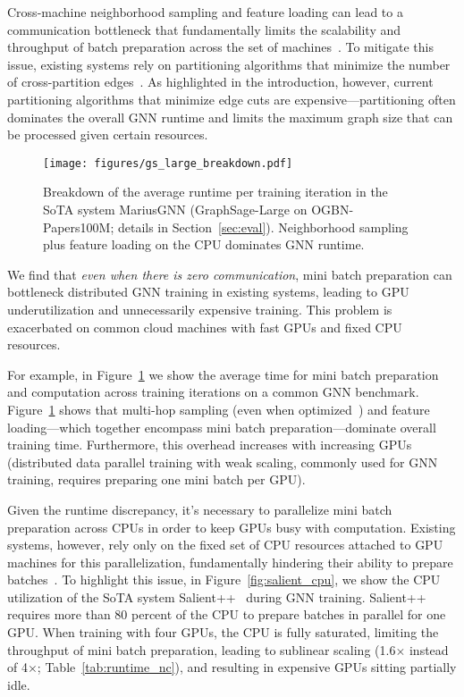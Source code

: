 Cross-machine neighborhood sampling and feature loading can lead to a communication bottleneck that fundamentally limits the scalability and throughput of batch preparation across the set of machines~\cite{salient++}. To mitigate this issue, existing systems rely on partitioning algorithms that minimize the number of cross-partition edges~\cite{distdglv2}. As highlighted in the introduction, however, current partitioning algorithms that minimize edge cuts are expensive---partitioning often dominates the overall GNN runtime and limits the maximum graph size that can be processed given certain resources. 



\begin{figure}[t]
  \centering
  \texttt{[image: figures/gs\_large\_breakdown.pdf]}
  \vspace{-0.15in}
  \caption{Breakdown of the average runtime per training iteration in the SoTA system MariusGNN (GraphSage-Large on OGBN-Papers100M; details in Section~\ref{sec:eval}). Neighborhood sampling plus feature loading on the CPU dominates GNN runtime.}
  \label{fig:armada_breakdown}
  \vspace{-0.15in}
\end{figure}



We find that \textit{even when there is zero communication}, mini batch preparation can bottleneck distributed GNN training in existing systems, leading to GPU underutilization and unnecessarily expensive training. This problem is exacerbated on common cloud machines with fast GPUs and fixed CPU resources. 

For example, in Figure~\ref{fig:armada_breakdown} we show the average time for mini batch preparation and computation across training iterations on a common GNN benchmark. Figure~\ref{fig:armada_breakdown} shows that multi-hop sampling (even when optimized~\cite{mariusgnn}) and feature loading---which together encompass mini batch preparation---dominate overall training time. Furthermore, this overhead increases with increasing GPUs (distributed data parallel training with weak scaling, commonly used for GNN training, requires preparing one mini batch per GPU). 

Given the runtime discrepancy, it's necessary to parallelize mini batch preparation across CPUs in order to keep GPUs busy with computation. Existing systems, however, rely only on the fixed set of CPU resources attached to GPU machines for this parallelization, fundamentally hindering their ability to prepare batches~\cite{salient, distdglv2}. To highlight this issue, in Figure~\ref{fig:salient_cpu}, we show the CPU utilization of the SoTA system Salient++~\cite{salient++} during GNN training. Salient++ requires more than 80 percent of the CPU to prepare batches in parallel for one GPU. When training with four GPUs, the CPU is fully saturated, limiting the throughput of mini batch preparation, leading to sublinear scaling (1.6$\times$ instead of 4$\times$; Table~\ref{tab:runtime_nc}), and resulting in expensive GPUs sitting partially idle.

